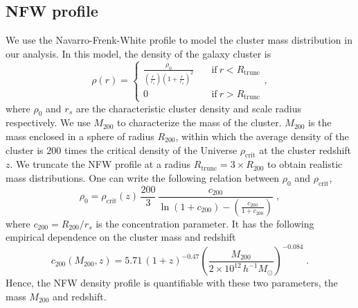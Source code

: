 \documentclass[prd, superscriptaddress, tightenlines, longbibliography, nofootinbib, eqsecnum, amsfonts, amsmath, floatfix, twocolumn, notitlepage]{revtex4-2}
\begin{document}
\subsection{NFW profile}

We use the Navarro-Frenk-White profile \cite[NFW,][]{Navarro:1995iw} to model the cluster mass distribution in our analysis. In this model, the density of the galaxy cluster is
\begin{equation}\label{eq:NFW}
    \rho(r) = \begin{cases} \displaystyle 
               \frac{\rho_0}{(\frac{r}{r_s})(1+\frac{r}{r_s})^2} &\quad \text{if} \ r < R_{\text{trunc}} \\
               0  &\quad \text{if} \ r > R_{\text{trunc}}
               \end{cases},
\end{equation}
where $\rho_0$ and $r_s$ are the characteristic cluster density and scale radius respectively. 
We use $M_{200}$ to characterize the mass of the cluster. $M_{200}$ is the mass enclosed in a sphere of radius $R_{200}$, within which the average density of the cluster is $200$ times the critical density of the Universe $\rho_{\text{crit}}$ at the cluster redshift $z$.
We truncate the NFW profile at a radius $R_{\text{trunc}} = 3\times R_{200}$ to obtain realistic mass distributions.
One can write the following relation between $\rho_0$ and $\rho_{\text{crit}}$,
\begin{equation}\label{eq:rho_0}
    \rho_0 = \rho_{\text{crit}}(z) \,  \frac{200}{3} \,  \frac{c_{200}}{ \displaystyle \ln{(1+c_{200})}-\left(\frac{c_{200}}{1+c_{200}}\right)} \; ,
\end{equation}
where $c_{200} = R_{200}/r_s$ is the concentration parameter. It has the following empirical dependence on the cluster mass and redshift \cite{Duffy:2008pz, Geach:2017crt}
\begin{equation}\label{eq:c200}
    c_{200}(M_{200}, z) = 5.71 \, (1+z)^{-0.47} \left(\frac{M_{200}}{2\times10^{12} \, h^{-1}M_{\odot}}\right)^{-0.084} \; .
\end{equation}
Hence, the NFW density profile is quantifiable with these two parameters, the mass $M_{200}$ and redshift.
\end{document}
